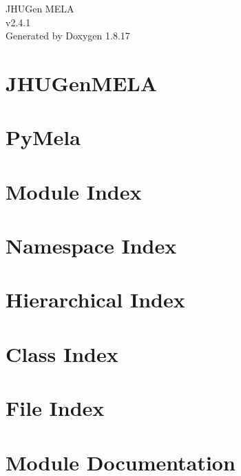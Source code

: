 \let\mypdfximage\pdfximage\def\pdfximage{\immediate\mypdfximage}\documentclass[twoside]{book}
\newcommand{\+}{\discretionary{\mbox{\scriptsize$\hookleftarrow$}}{}{}}
\newcommand{\clearemptydoublepage}{%
  \newpage{\pagestyle{empty}\cleardoublepage}%
}
\begin{document}
\hypersetup{pageanchor=false,
             bookmarksnumbered=true,
             pdfencoding=unicode
            }
\begin{titlepage}
\vspace*{7cm}
\begin{center}%
{\Large J\+H\+U\+Gen M\+E\+LA \\[1ex]\large v2.\+4.\+1 }\\
\vspace*{1cm}
{\large Generated by Doxygen 1.8.17}\\
\end{center}
\end{titlepage}
\clearemptydoublepage
{}
\tableofcontents
\clearemptydoublepage
{}
\hypersetup{pageanchor=true}

\chapter{J\+H\+U\+Gen\+M\+E\+LA}
\label{index}\hypertarget{index}{}
\chapter{Py\+Mela}
\label{PyMela_page}

\chapter{Module Index}

\chapter{Namespace Index}

\chapter{Hierarchical Index}

\chapter{Class Index}

\chapter{File Index}

\chapter{Module Documentation}





\end{document}
